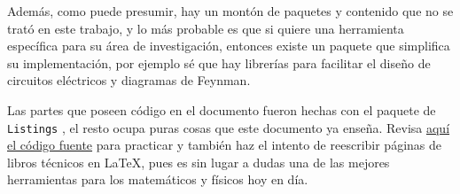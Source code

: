 \documentclass[intro-breve-latex.tex]{subfiles}
\begin{document}
Además, como puede presumir, hay un montón de paquetes y contenido que no se trató en este trabajo, y lo más probable es
que si quiere una herramienta específica para su área de investigación, entonces existe un paquete que simplifica su
implementación, por ejemplo sé que hay librerías para facilitar el diseño de circuitos eléctricos y diagramas de
Feynman.

Las partes que poseen código en el documento fueron hechas con el paquete de \texttt{Listings} \cite{listings}, el resto
ocupa puras cosas que este documento ya enseña.
Revisa \href{https://github.com/JoseCuevasBtos/apuntes-tex/blob/master/intro-breve-latex.tex}{aquí el código fuente}
para practicar y también haz el intento de reescribir páginas de libros técnicos en \LaTeX{}, pues es sin lugar a dudas
una de las mejores herramientas para los matemáticos y físicos hoy en día.

\printbibliography[category=math]
\end{document}

